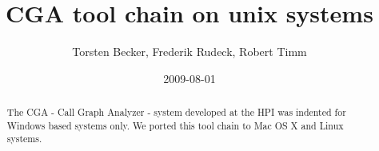 \documentclass[]{article}
\title{CGA tool chain on unix systems}
\author{ Torsten Becker, Frederik Rudeck, Robert Timm  }
\date{2009-08-01}
\begin{document}
\ifpdf
{}
\else
{}
\fi

\maketitle


\begin{abstract}
The CGA - Call Graph Analyzer - system developed at the HPI was indented for Windows based systems only. We ported this tool chain to Mac OS X and Linux systems.

\end{abstract}






\end{document}
